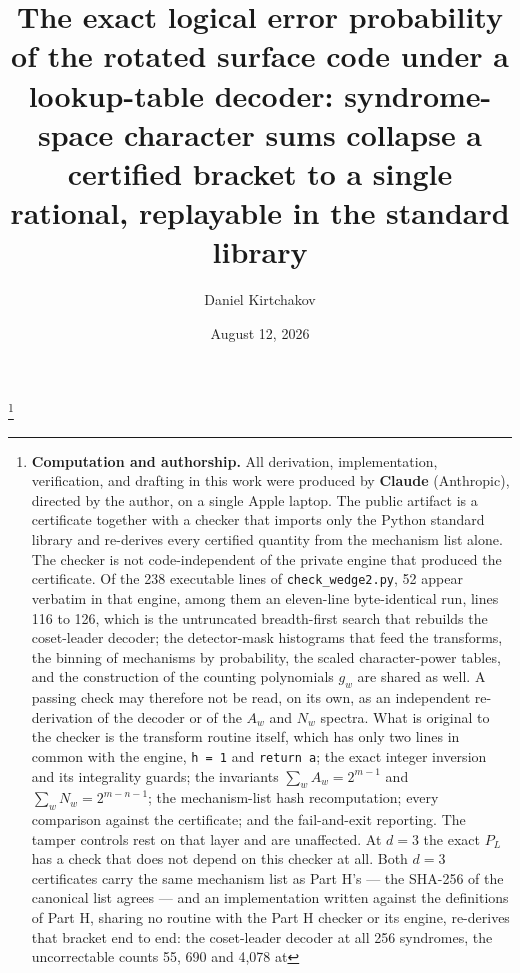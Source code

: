\documentclass[11pt]{amsart}
\newcommand{\PL}{P_{L}}
\theoremstyle{plain}
\theoremstyle{definition}
\theoremstyle{remark}
\begin{document}
\title[The exact logical error probability]{The exact logical error
probability of the rotated surface code under a lookup-table decoder:
syndrome-space character sums collapse a certified bracket to a single
rational, replayable in the standard library}

\author{Daniel Kirtchakov}
\address{Independent researcher (\texttt{05oz}), Half Ounce Research; no
institutional affiliation. ORCID
\href{https://orcid.org/0009-0009-5213-4098}{0009-0009-5213-4098}.}

\date{August 12, 2026}

\thanks{\textbf{Computation and authorship.} All derivation, implementation,
verification, and drafting in this work were produced by \textbf{Claude}
(Anthropic), directed by the author, on a single Apple laptop. The public
artifact is a certificate together with a checker that imports
only the Python standard library and re-derives every certified quantity
from the mechanism list alone. The checker is not code-independent of the
private engine that produced the certificate. Of the 238 executable lines of
\texttt{check\_wedge2.py}, 52 appear verbatim in that engine, among them an
eleven-line byte-identical run, lines 116 to 126, which is the untruncated
breadth-first search that rebuilds the coset-leader decoder; the
detector-mask histograms that feed the transforms, the binning of mechanisms
by probability, the scaled character-power tables, and the construction of
the counting polynomials $g_w$ are shared as well. A passing check may
therefore not be read, on its own, as an independent re-derivation of the
decoder or of the $A_w$ and $N_w$ spectra.\endgraf
What is original to the checker is the transform routine itself, which has
only two lines in common with the engine, \texttt{h = 1} and \texttt{return
a}; the exact integer inversion and its integrality guards; the invariants
$\sum_w A_w = 2^{m-1}$ and $\sum_w N_w = 2^{m-n-1}$; the mechanism-list hash
recomputation; every comparison against the certificate; and the
fail-and-exit reporting. The tamper controls rest on that layer and are
unaffected.\endgraf
At $d=3$ the exact $\PL$ has a check that does not depend on this checker at
all. Both $d=3$ certificates carry the same mechanism list as Part H's ---
the SHA-256 of the canonical list agrees --- and an implementation written
against the definitions of Part H, sharing no routine with the Part H
checker or its engine, re-derives that bracket end to end: the coset-leader
decoder at all 256 syndromes, the uncorrectable counts 55, 690 and 4,078 at
}
\end{document}
